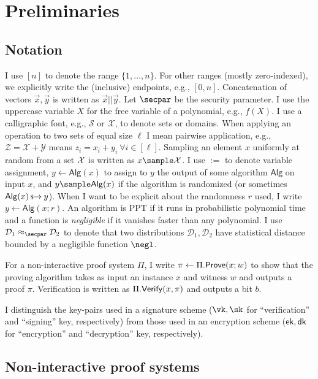 \chapter{Preliminaries}\label{sec:prelims}
\minitoc

\section{Notation}
I use $[n]$ to denote the range $\{1, \dots, n\}$. For other ranges (mostly zero-indexed), we explicitly write the (inclusive) endpoints, e.g., $[0,n]$. 
Concatenation of vectors $\vec{x},\vec{y}$ is written as $\vec{x} || \vec{y}$. 
Let $\secpar$ be the security parameter.
I use the uppercase variable $X$ for the free variable of a polynomial, e.g., $f(X)$. 
I use a calligraphic font, e.g., $\mathcal{S}$ or $\mathcal{X}$, to denote sets or domains. When applying an operation to two sets of equal size $\ell$ I mean pairwise application, e.g., $\mathcal{Z} = \mathcal{X} + \mathcal{Y}$ means $z_i = x_i + y_i~\forall{i \in [\ell]}$.
Sampling an element $x$ uniformly at random from a set $\mathcal{X}$ is written as $x \sample \X$. 
I use $:=$ to denote variable assignment, $y \gets \mathsf{Alg}(x)$ to assign to $y$ the output of some algorithm $\mathsf{Alg}$ on input $x$, and $y \sample \mathsf{Alg}(x)$ if the algorithm is randomized (or sometimes $\mathsf{Alg}(x) \,{\mbox{\scriptsize${\$}$\normalsize}\!\!\to}\hskip2.3pt y$). When I want to be explicit about the randomness $r$ used, I write $y \gets \mathsf{Alg}(x; r)$. 
An algorithm is PPT if it runs in probabilistic polynomial time and a function is \emph{negligible} if it vanishes faster than any polynomial.
I use $\mathcal{D}_1 \approx_\secpar \mathcal{D}_2$ to denote that two distributions $\mathcal{D}_1, \mathcal{D}_2$ have statistical distance bounded by a negligible function $\negl$.

For a non-interactive proof system $\Pi$, I write $\pi \gets \Pi.\mathsf{Prove}(x; w)$ to show that the proving algorithm takes as input an instance $x$ and witness $w$ and outputs a proof $\pi$. Verification is written as $\Pi.{\mathsf{Verify}}(x, \pi)$ and outputs a bit $b$. 

I distinguish the key-pairs used in a signature scheme ($\vk, \sk$ for ``verification'' and ``signing'' key, respectively) from those used in an encryption scheme ($\mathsf{ek}, \mathsf{dk}$ for ``encryption'' and ``decryption'' key, respectively). 

\section{Non-interactive proof systems}\label{sec:nizks}

